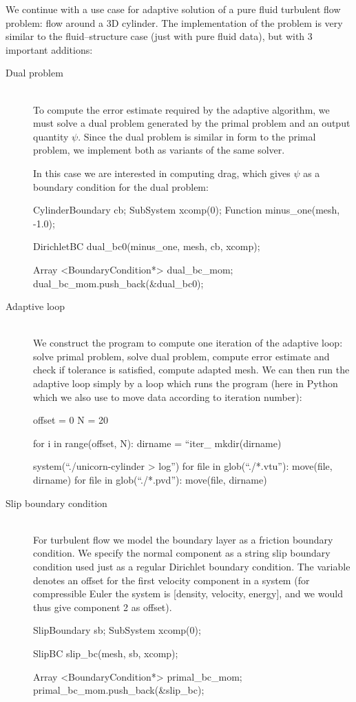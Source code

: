 We continue with a use case for adaptive solution of a pure fluid
turbulent flow problem: flow around a 3D cylinder. The implementation
of the problem is very similar to the fluid--structure case (just with
pure fluid data), but with 3 important additions:
\begin{description}
\item[Dual problem]
\ \\
To compute the error estimate required by the adaptive algorithm, we
must solve a dual problem generated by the primal problem and an
output quantity $\psi$. Since the dual problem is similar in form to
the primal problem, we implement both as variants of the same solver.

In this case we are interested in computing drag, which gives $\psi$
as a boundary condition for the dual problem:

\begin{c++}
CylinderBoundary cb;
SubSystem xcomp(0);
Function minus_one(mesh, -1.0);

DirichletBC dual_bc0(minus_one, mesh, cb, xcomp);

Array <BoundaryCondition*> dual_bc_mom;
dual_bc_mom.push_back(&dual_bc0);
\end{c++}


\item[Adaptive loop]
\ \\
We construct the program to compute one iteration of the adaptive
loop: solve primal problem, solve dual problem, compute error estimate
and check if tolerance is satisfied, compute adapted mesh. We can then
run the adaptive loop simply by a loop which runs the program (here in
Python which we also use to move data according to iteration number):
\begin{python}
offset = 0
N = 20

for i in range(offset, N):
    dirname = ``iter_%
    mkdir(dirname)

    system(``./unicorn-cylinder > log'')
    for file in glob(``./*.vtu''):
    move(file, dirname)
    for file in glob(``./*.pvd''):
    move(file, dirname)
\end{python}


\item[Slip boundary condition]
\ \\
For turbulent flow we model the boundary layer as a friction boundary
condition. We specify the normal component as a string slip boundary
condition used just as a regular Dirichlet boundary condition. The
 variable denotes an offset for the first velocity
component in a system (for compressible Euler the system is [density,
velocity, energy], and we would thus give component 2 as offset).
\begin{c++}
SlipBoundary sb;
SubSystem xcomp(0);

SlipBC slip_bc(mesh, sb, xcomp);

Array <BoundaryCondition*> primal_bc_mom;
primal_bc_mom.push_back(&slip_bc);
\end{c++}


\end{description}


